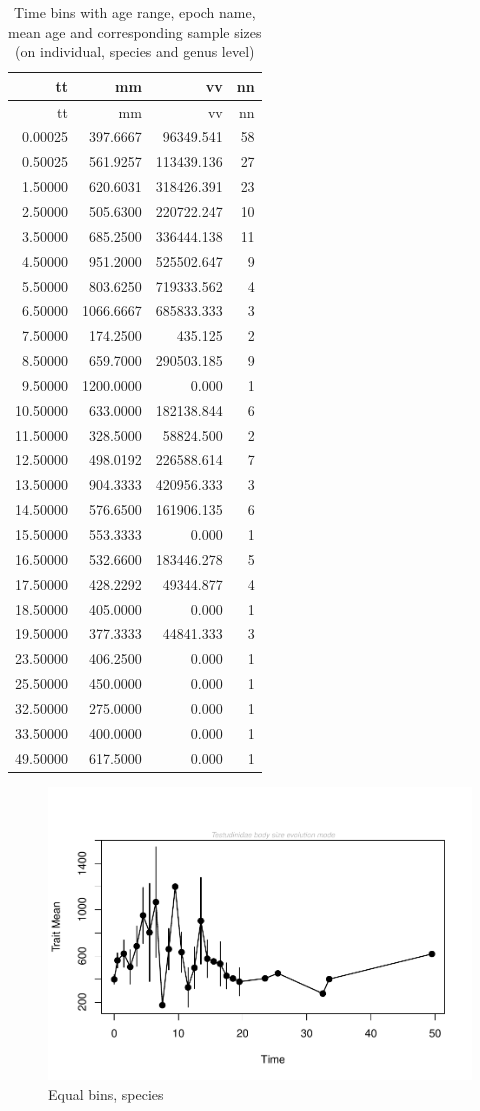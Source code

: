 \documentclass[]{article}
\begin{document}
\begin{longtable}[]{@{}rrrr@{}}
\caption{Time bins with age range, epoch name, mean age and
corresponding sample sizes (on individual, species and genus
level)}\tabularnewline
\toprule
tt & mm & vv & nn\tabularnewline
\midrule
\endfirsthead
\toprule
tt & mm & vv & nn\tabularnewline
\midrule
\endhead
0.00025 & 397.6667 & 96349.541 & 58\tabularnewline
0.50025 & 561.9257 & 113439.136 & 27\tabularnewline
1.50000 & 620.6031 & 318426.391 & 23\tabularnewline
2.50000 & 505.6300 & 220722.247 & 10\tabularnewline
3.50000 & 685.2500 & 336444.138 & 11\tabularnewline
4.50000 & 951.2000 & 525502.647 & 9\tabularnewline
5.50000 & 803.6250 & 719333.562 & 4\tabularnewline
6.50000 & 1066.6667 & 685833.333 & 3\tabularnewline
7.50000 & 174.2500 & 435.125 & 2\tabularnewline
8.50000 & 659.7000 & 290503.185 & 9\tabularnewline
9.50000 & 1200.0000 & 0.000 & 1\tabularnewline
10.50000 & 633.0000 & 182138.844 & 6\tabularnewline
11.50000 & 328.5000 & 58824.500 & 2\tabularnewline
12.50000 & 498.0192 & 226588.614 & 7\tabularnewline
13.50000 & 904.3333 & 420956.333 & 3\tabularnewline
14.50000 & 576.6500 & 161906.135 & 6\tabularnewline
15.50000 & 553.3333 & 0.000 & 1\tabularnewline
16.50000 & 532.6600 & 183446.278 & 5\tabularnewline
17.50000 & 428.2292 & 49344.877 & 4\tabularnewline
18.50000 & 405.0000 & 0.000 & 1\tabularnewline
19.50000 & 377.3333 & 44841.333 & 3\tabularnewline
23.50000 & 406.2500 & 0.000 & 1\tabularnewline
25.50000 & 450.0000 & 0.000 & 1\tabularnewline
32.50000 & 275.0000 & 0.000 & 1\tabularnewline
33.50000 & 400.0000 & 0.000 & 1\tabularnewline
49.50000 & 617.5000 & 0.000 & 1\tabularnewline
\bottomrule
\end{longtable}

\begin{figure}[htbp]
\centering
\includegraphics{MA_JJ_files/figure-latex/Play around with time bins, equal bin, species level-1.pdf}
\caption{Equal bins, species}
\end{figure}
\end{document}
